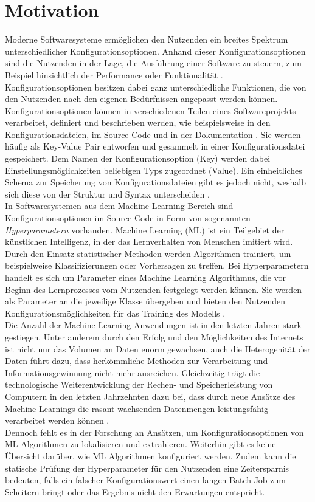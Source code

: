 \documentclass[german,bachelor]{swsLeipzig}
\begin{document}
\section{Motivation}
Moderne Softwaresysteme ermöglichen den Nutzenden ein breites Spektrum unterschiedlicher Konfigurationsoptionen.
Anhand dieser Konfigurationsoptionen sind die Nutzenden in der Lage, die Ausführung einer Software zu steuern, zum Beispiel
hinsichtlich der Performance oder Funktionalität \cite[]{10.1145/3427921.3450255}.
Konfigurationsoptionen besitzen dabei ganz unterschiedliche Funktionen, die von den Nutzenden nach den eigenen Bedürfnissen angepasst werden können.\\
\indent Konfigurationsoptionen können in verschiedenen Teilen eines Softwareprojekts verarbeitet, definiert und beschrieben werden,
wie beispielsweise in den Konfigurationsdateien, im Source Code und in der Dokumentation \cite[]{7774519}.
Sie werden häufig als Key-Value Pair entworfen und gesammelt in einer Konfigurationsdatei gespeichert.
Dem Namen der Konfigurationsoption (Key) werden dabei Einstellungsmöglichkeiten beliebigen Typs zugeordnet (Value).
Ein einheitliches Schema zur Speicherung von Konfigurationsdateien gibt es jedoch nicht, weshalb sich diese
von der Struktur und Syntax unterscheiden \cite[]{10.1145/1985793.1985812}.\\
\indent In Softwaresystemen aus dem Machine Learning Bereich sind Konfigurationsoptionen im Source Code
in Form von sogenannten \textit{Hyperparametern} vorhanden.
Machine Learning (ML) ist ein Teilgebiet der künstlichen Intelligenz, in der das Lernverhalten von Menschen imitiert wird.
Durch den Einsatz statistischer Methoden werden Algorithmen trainiert, um beispielweise Klassifizierungen oder Vorhersagen
zu treffen.
Bei Hyperparametern handelt es sich um Parameter eines Machine Learning Algorithmus,
die vor Beginn des Lernprozesses vom Nutzenden festgelegt werden können.
Sie werden als Parameter an die jeweilige Klasse übergeben und bieten den Nutzenden Konfigurationsmöglichkeiten für
das Training des Modells \cite[]{hype}.\\
\indent Die Anzahl der Machine Learning Anwendungen ist in den letzten Jahren stark gestiegen.
Unter anderem durch den Erfolg und den Möglichkeiten des Internets ist nicht nur das Volumen an Daten enorm gewachsen,
auch die Heterogenität der Daten führt dazu, dass herkömmliche Methoden zur Verarbeitung
und Informationsgewinnung nicht mehr ausreichen.
Gleichzeitig trägt die technologische Weiterentwicklung der Rechen- und Speicherleistung von Computern in den letzten Jahrzehnten dazu bei,
dass durch neue Ansätze des Machine Learnings die rasant wachsenden Datenmengen leistungsfähig verarbeitet werden können \cite[]{FRADKOV20201385}.\\
\indent Dennoch fehlt es in der Forschung an Ansätzen, um Konfigurationsoptionen von ML Algorithmen zu lokalisieren und extrahieren.
Weiterhin gibt es keine Übersicht darüber, wie ML Algorithmen konfiguriert werden.
Zudem kann die statische Prüfung der Hyperparameter für den Nutzenden eine Zeitersparnis bedeuten,
falls ein falscher Konfigurationswert einen langen Batch-Job zum Scheitern bringt
oder das Ergebnis nicht den Erwartungen entspricht. \\
\end{document}
